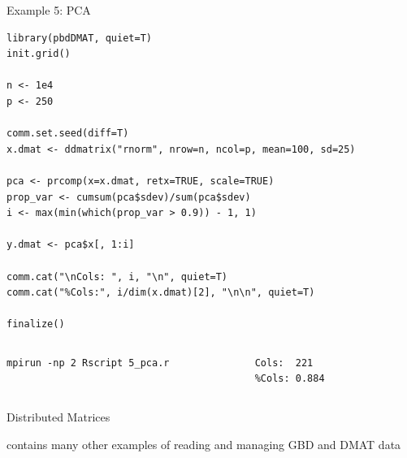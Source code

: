 \begin{frame}[fragile]
\fontsize{8pt}{7.2}\selectfont
  \begin{exampleblock}{Example 5:  PCA}
\begin{lstlisting}[basicstyle=\tiny,title=\fontsize{8pt}{7.2}\selectfont PCA: pca.r]
library(pbdDMAT, quiet=T)
init.grid()

n <- 1e4
p <- 250

comm.set.seed(diff=T)
x.dmat <- ddmatrix("rnorm", nrow=n, ncol=p, mean=100, sd=25)

pca <- prcomp(x=x.dmat, retx=TRUE, scale=TRUE)
prop_var <- cumsum(pca$sdev)/sum(pca$sdev)
i <- max(min(which(prop_var > 0.9)) - 1, 1)

y.dmat <- pca$x[, 1:i]

comm.cat("\nCols: ", i, "\n", quiet=T)
comm.cat("%Cols:", i/dim(x.dmat)[2], "\n\n", quiet=T)

finalize()
\end{lstlisting}
\vspace{-.4cm}
  \begin{columns}[t,onlytextwidth]
    \begin{column}{0.58\textwidth}
\begin{lstlisting}[basicstyle=\tiny,backgroundcolor=\color{white},keywordstyle=\color{black},title=\fontsize{6pt}{7.2}\selectfont Execute this script via:]
mpirun -np 2 Rscript 5_pca.r
\end{lstlisting}    
    \end{column}
    \hfill
    \begin{column}{0.4\textwidth}
\begin{lstlisting}[basicstyle=\tiny,title=\fontsize{6pt}{7.2}\selectfont Sample Output:]
Cols:  221 
%Cols: 0.884 
\end{lstlisting}
    \end{column}
​  \end{columns}
  \end{exampleblock}
\end{frame}



\begin{frame}
  \begin{block}{Distributed Matrices}\pause
  \begin{center}
     contains many other examples of reading and managing GBD and DMAT data
  \end{center}
  \end{block}
\end{frame}



